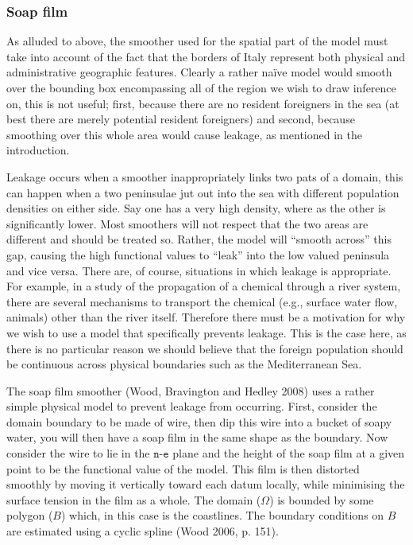 \documentclass[10pt] {article}
\theoremstyle{definition}
\theoremstyle{plain}
\begin{document}
\subsubsection{Soap film \label{SF}}

As alluded to above, the smoother used for the spatial part of the model must take into account of the fact that the borders of Italy represent both physical and administrative geographic features. Clearly a rather na\"ive model would smooth over the bounding box encompassing all of the region we wish to draw inference on, this is not useful; first, because there are no resident foreigners in the sea (at best there are merely potential resident foreigners) and second, because smoothing over this whole area would cause leakage, as mentioned in the introduction.

Leakage occurs when a smoother inappropriately links two pats of a domain, this can happen when a two peninsulae jut out into the sea with different population densities on either side. Say one has a very high density, where as the other is significantly lower. Most smoothers will not respect that the two areas are different and should be treated so. Rather, the model will ``smooth across'' this gap, causing the high functional values to ``leak'' into the low valued peninsula and vice versa. There are, of course, situations in which leakage is appropriate. For example, in a study of the propagation of a chemical through a river system, there are several mechanisms to transport the chemical (e.g., surface water flow, animals) other than the river itself. Therefore there must be a motivation for why we wish to use a model that specifically prevents leakage. This is the case here, as there is no particular reason we should believe that the foreign population should be continuous across physical boundaries such as the Mediterranean Sea.

The soap film smoother (Wood, Bravington and Hedley 2008) uses a rather simple physical model to prevent leakage from occurring. First, consider the domain boundary to be made of wire, then dip this wire into a bucket of soapy water, you will then have a soap film in the same shape as the boundary. Now consider the wire to lie in the $\texttt{n}$-$\texttt{e}$ plane and the height of the soap film at a given point to be the functional value of the model. This film is then distorted smoothly by moving it vertically toward each datum locally, while minimising the surface tension in the film as a whole. The domain ($\Omega$) is bounded by some polygon ($B$) which, in this case is the coastlines. The boundary conditions on $B$ are estimated using a cyclic spline (Wood 2006, p. 151).
\end{document}
